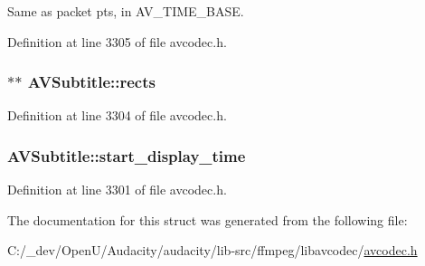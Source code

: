 Same as packet pts, in A\+V\+\_\+\+T\+I\+M\+E\+\_\+\+B\+A\+SE. 



Definition at line 3305 of file avcodec.\+h.

\subsubsection[{\texorpdfstring{rects}{rects}}]{$\ast$$\ast$ A\+V\+Subtitle\+::rects}\hypertarget{struct_a_v_subtitle_ad37c2315a9e36ed700f64cb971e22298}{}\label{struct_a_v_subtitle_ad37c2315a9e36ed700f64cb971e22298}


Definition at line 3304 of file avcodec.\+h.

\subsubsection[{\texorpdfstring{start\+\_\+display\+\_\+time}{start_display_time}}]{ A\+V\+Subtitle\+::start\+\_\+display\+\_\+time}\hypertarget{struct_a_v_subtitle_a271f635c9e734310a43277f819159c68}{}\label{struct_a_v_subtitle_a271f635c9e734310a43277f819159c68}


Definition at line 3301 of file avcodec.\+h.



The documentation for this struct was generated from the following file\+:\begin{DoxyCompactItemize}
\item 
C\+:/\+\_\+dev/\+Open\+U/\+Audacity/audacity/lib-\/src/ffmpeg/libavcodec/\hyperlink{avcodec_8h}{avcodec.\+h}\end{DoxyCompactItemize}
